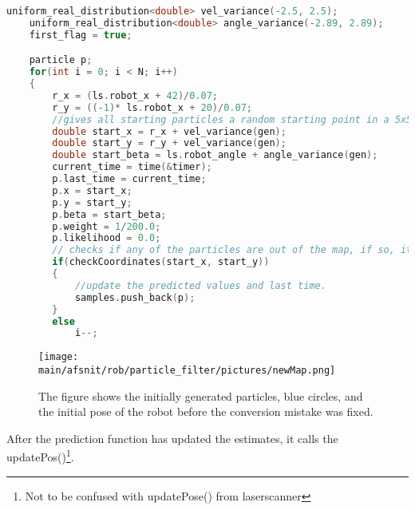 \documentclass[../../../Main.tex]{subfiles}
\begin{document}
\begin{lstlisting}[language=C++, caption= Codesippet of the initial prediction of the particles, label={lst:prediction}]
uniform_real_distribution<double> vel_variance(-2.5, 2.5);
    uniform_real_distribution<double> angle_variance(-2.89, 2.89);
    first_flag = true;

    particle p;
    for(int i = 0; i < N; i++)
    {
        r_x = (ls.robot_x + 42)/0.07;
        r_y = ((-1)* ls.robot_x + 20)/0.07;
        //gives all starting particles a random starting point in a 5x5 cube
        double start_x = r_x + vel_variance(gen);
        double start_y = r_y + vel_variance(gen);
        double start_beta = ls.robot_angle + angle_variance(gen);
        current_time = time(&timer);
        p.last_time = current_time;
        p.x = start_x;
        p.y = start_y;
        p.beta = start_beta;
        p.weight = 1/200.0;
        p.likelihood = 0.0;
        // checks if any of the particles are out of the map, if so, it tries again
        if(checkCoordinates(start_x, start_y))
        {
            //update the predicted values and last time.
            samples.push_back(p);
        }
        else
            i--;
\end{lstlisting}

\begin{figure}[H]
  \centering
  \texttt{[image: \\main/afsnit/rob/particle\_filter/pictures/newMap.png]}
  \caption{The figure shows the initially generated particles, blue circles, and the initial pose of the robot before the conversion mistake was fixed. }
  \label{fig:particle_filter_initial}
\end{figure}
After the prediction function has updated the estimates, it calls the updatePos()\footnote{Not to be confused with updatePose() from laserscanner}.\\
\end{document}
